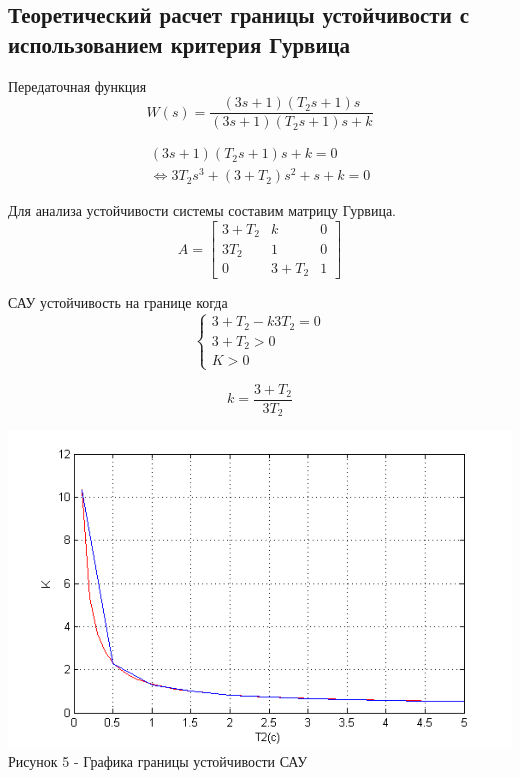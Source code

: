\documentclass[a4paper, 11pt]{article}
\begin{document}
\subsection{Теоретический расчет границы устойчивости с использованием критерия Гурвица}


    Передаточная функция 
    \begin{equation}
      W(s) = \frac{{(3s + 1)({T_2}s + 1)s}}{{(3s + 1)({T_2}s + 1)s + k}}
    \end{equation}

\[\begin{array}{l}
(3s + 1)({T_2}s + 1)s + k = 0\\
\Leftrightarrow 3{T_2}{s^3} + (3 + {T_2}){s^2} + s + k = 0
\end{array}\]

Для анализа устойчивости системы составим матрицу Гурвица.
\begin{equation}
A = \begin{bmatrix}
3 + T_2 &  k & 0 \\
3 T_2 & 1 & 0 \\
0 & 3 + T_2 & 1
\end{bmatrix}
\end{equation}

САУ устойчивость на границе когда %
\begin{equation}
\begin{cases}
3 + T_2 - k 3 T_2 = 0 \\
3 + T_2 > 0 \\
K > 0
\end{cases}
\end{equation}

\begin{equation}
k =\frac{3 + T_2}{3T_2}
\end{equation}

\begin{center}
		\includegraphics[width=0.7\linewidth]{4}
		\\
	\centering  Рисунок 5 - Графика границы устойчивости САУ

	
\end{center}
\end{document}
